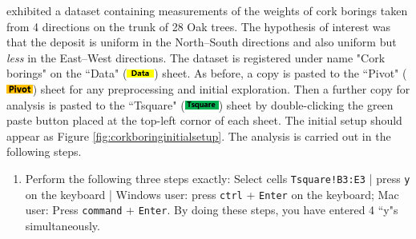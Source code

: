 \documentclass[article]{jss}
\newcommand{\shtData}{``Data" (\includegraphics[height=8pt, keepaspectratio=true]{DataSheetTab_png}) }
\newcommand{\shtPivot}{``Pivot" (\includegraphics[height=8pt, keepaspectratio=true]{PivotSheetTab_png}) }
\newcommand{\shtTsquare}{``Tsquare" (\includegraphics[height=8pt, keepaspectratio=true]{TsquareSheetTab_png}) }
\begin{document}
        \cite{rao1948corkboring} exhibited a dataset containing measurements of the weights of  cork borings taken from 4 directions on the trunk of 28 Oak trees. The hypothesis of interest was that the deposit is uniform in the North--South directions and also uniform but \emph{less} in the East--West directions. The dataset is registered under name "Cork borings" on the \shtData sheet. As before, a copy is pasted to the \shtPivot sheet for any preprocessing and initial exploration. Then a further copy for analysis is pasted to the \shtTsquare sheet by double-clicking the green paste button placed at the top-left cornor of each sheet. The initial setup should appear as Figure \ref{fig:corkboringinitialsetup}. The analysis is carried out in the following steps.
        \begin{enumerate}
                \item Perform the following three steps exactly: Select cells \texttt{Tsquare!B3:E3} | press \texttt{y} on the keyboard | Windows user: press \texttt{ctrl} + \texttt{Enter} on the keyboard; Mac user: Press \texttt{command} + \texttt{Enter}. By doing these steps, you have entered 4 ``y"s simultaneously.
                
                
                

\end{enumerate}
\end{document}
